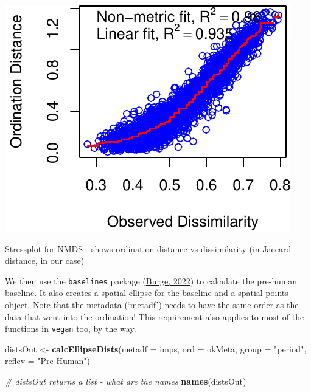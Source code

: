 \documentclass[nofonts,]{tufte-handout}
\newenvironment{Shaded}{\begin{snugshade}}{\end{snugshade}}
\newcommand{\AttributeTok}[1]{\textcolor[rgb]{0.13,0.29,0.53}{#1}}
\newcommand{\CommentTok}[1]{\textcolor[rgb]{0.56,0.35,0.01}{\textit{#1}}}
\newcommand{\FunctionTok}[1]{\textcolor[rgb]{0.13,0.29,0.53}{\textbf{#1}}}
\newcommand{\NormalTok}[1]{#1}
\newcommand{\OtherTok}[1]{\textcolor[rgb]{0.56,0.35,0.01}{#1}}
\newcommand{\StringTok}[1]{\textcolor[rgb]{0.31,0.60,0.02}{#1}}
\begin{document}
\begin{marginfigure}
\includegraphics{Technical-supplement_files/figure-latex/fig-margin-1} \caption[Stressplot for NMDS - shows ordination distance vs dissimilarity (in Jaccard distance, in our case)]{Stressplot for NMDS - shows ordination distance vs dissimilarity (in Jaccard distance, in our case)}\label{fig:fig-margin}
\end{marginfigure}

We then use the \texttt{baselines} package
(\protect\hyperlink{ref-burge_2022_baselines}{Burge, 2022}) to calculate
the pre-human baseline. It also creates a spatial ellipse for the
baseline and a spatial points object. Note that the metadata (`metadf')
needs to have the same order as the data that went into the ordination!
This requirement also applies to most of the functions in \texttt{vegan}
too, by the way.

\begin{Shaded}
\begin{Highlighting}[]
\NormalTok{distsOut }\OtherTok{\textless{}{-}} \FunctionTok{calcEllipseDists}\NormalTok{(}\AttributeTok{metadf =}\NormalTok{ imps, }
                        \AttributeTok{ord =}\NormalTok{ okMeta,}
                        \AttributeTok{group =} \StringTok{"period"}\NormalTok{, }
                        \AttributeTok{reflev =} \StringTok{"Pre{-}Human"}\NormalTok{)}

\CommentTok{\# distsOut returns a list {-} what are the names}
\FunctionTok{names}\NormalTok{(distsOut)}
\end{Highlighting}
\end{Shaded}
\end{document}
